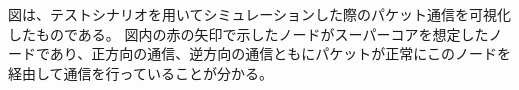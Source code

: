 \begin{comment}
\begin{figure}[tb]
\begin{center}
\begin{tabular}{c}

\begin{minipage}{0.4\hsize}
\begin{center}
\texttt{[image: ./lena.eps]}
\hspace{1.6cm} [1]正方向の通信
\end{center}
\end{minipage}

\begin{minipage}{0.4\hsize}
\begin{center}
\texttt{[image: ./lena-affine.eps]}
\hspace{1.6cm} [2]逆方向の通信
\end{center}
\end{minipage}

\end{tabular}
\caption{画像の変換例}
\label{fig:4-2}
\end{center}
\end{figure}
\end{comment}

図は、テストシナリオを用いてシミュレーションした際のパケット通信を可視化したものである。
図内の赤の矢印で示したノードがスーパーコアを想定したノードであり、正方向の通信、逆方向の通信ともにパケットが正常にこのノードを経由して通信を行っていることが分かる。

\begin{comment}
\begin{figure}[tb]
\begin{center}
\begin{tabular}{c}

\begin{minipage}{0.4\hsize}
\begin{center}
\texttt{[image: ./lena.eps]}
\hspace{1.6cm} [1]通常画像
\end{center}
\end{minipage}

\begin{minipage}{0.4\hsize}
\begin{center}
\texttt{[image: ./lena-affine.eps]}
\hspace{1.6cm} [2]アフィン変換(90度回転)
\end{center}
\end{minipage}

\end{tabular}
\caption{画像の変換例}
\label{fig:4-3}
\end{center}
\end{figure}
\end{comment}

